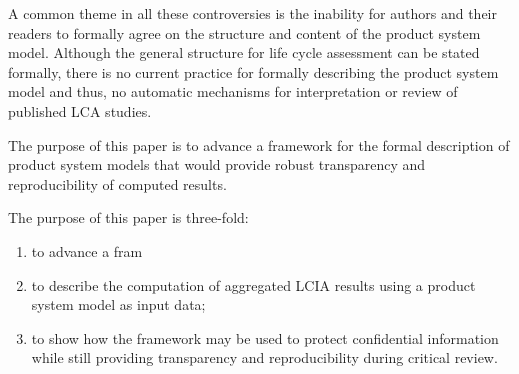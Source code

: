 A common theme in all these controversies is the inability for authors and their readers to formally agree on the structure and content of the product system model.  Although the general structure for life cycle assessment can be stated formally, there is no current practice for formally describing the product system model and thus, no automatic mechanisms for interpretation or review of published LCA studies.  

The purpose of this paper is to advance a framework for the formal description of product system models that would provide robust transparency and reproducibility of computed results.  



The purpose of this paper is three-fold:
\begin{enumerate}[label=\roman*.]
\item to advance a fram
\item to describe the computation of aggregated LCIA results using a product system model as input data;
\item to show how the framework may be used to protect confidential information while still providing transparency and reproducibility during critical review.
\end{enumerate}



\endinput

o advance a framework for the formal description of a subset of LCA studies that can be used to document, validate, and reproduce the computations that lead from model specification to LCIA results.  The framework can also 


But reproducibility of a computation requires a distinction between the computing algorithm and the input data \citep{Buckheit_1995, }; contemporary LCA lacks this distinction.  





What is the point of the new paper?


Some thoughts to put together and rearrange:


 * 

 * When a study is reviewed, it is often the written documentation and \emph{not} the product system model itself that is the object of review.  

  - In current practice, it is the responsibility of the study author to ensure that the written report accurately describes the model.  

  - Because the model itself may not be available for review, it is impossible for a reviewer to directly evaluate the author's claim that the model is accurately represented.


